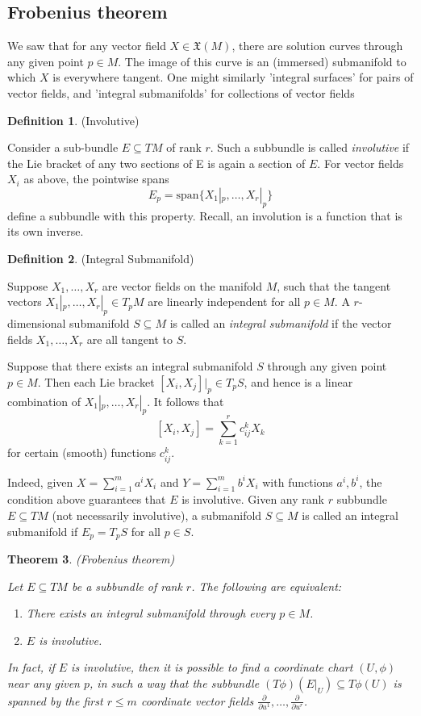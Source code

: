 \documentclass{article}
\newtheorem{theorem}{Theorem}[section]
\theoremstyle{definition}
\newtheorem{defn}[theorem]{Definition}
\newenvironment{definition}
  {\vspace{8pt}\begin{mdframed}[backgroundcolor=blueish]\begin{defn}}
  {\end{defn}\end{mdframed}\vspace{4pt}}
\begin{document}
\subsection{Frobenius theorem}
We saw that for any vector field $X \in \mathfrak X(M)$, there are solution curves through any given point $p \in M$. The image of this curve is an (immersed) submanifold to which $X$ is everywhere tangent. One might similarly 'integral surfaces' for pairs of vector fields, and 'integral submanifolds' for collections of vector fields

\begin{definition} (Involutive)

Consider a sub-bundle $E \subseteq TM$ of rank $r$. Such a subbundle is called \textit{involutive} if the Lie bracket of any two sections of E is again a section of $E$. For vector fields $X_i$ as above, the pointwise spans 
\[
    E_p = \text{span} \{X_1|_p,\dots,X_r |_p\}
\]
define a subbundle with this property. Recall, an involution is a function that is its own inverse.
\end{definition}


\begin{definition} (Integral Submanifold)

Suppose $X_1,\dots,X_r$ are vector fields on the manifold $M$, such that the tangent vectors $X_1|_p,\dots,X_r |_p \in T_pM$ are linearly independent for all $p \in M$. A $r$-dimensional submanifold $S \subseteq M$ is called an \textit{integral submanifold} if the vector fields $X_1,\dots,X_r$ are all tangent to $S$.

Suppose that there exists an integral submanifold $S$ through any given point $p \in M$. Then each Lie bracket $[X_i ,X_j ] |_p \in T_pS$, and hence is a linear combination of $X_1|_p,\dots,X_r |_p.$ It follows that 
\[ 
    [X_i ,X_j ] = \sum_{k=1}^r c^k_{ij}X_k
\]
for certain (smooth) functions $c^k_{i j}$.

Indeed, given $X = \sum_{i=1}^m a^i X_i$ and $Y = \sum^m_{i=1} b^i X_i$ with functions $a^i ,b^i$, the condition above guarantees that $E$ is involutive. Given any rank $r$ subbundle $E \subseteq TM$ (not necessarily involutive), a submanifold $S \subseteq M$ is
called an integral submanifold if $E_p = T_pS$ for all $p \in S$.
\end{definition}


\begin{theorem} (Frobenius theorem)

Let $E \subseteq TM$ be a subbundle of rank $r$. The following are equivalent: 
\begin{enumerate}
    \item There exists an integral submanifold through every $p \in M$.
    \item $E$ is involutive. 
\end{enumerate}

In fact, if $E$ is involutive, then it is possible to find a coordinate chart $(U,\phi)$ near any given $p$, in such a way that the subbundle $(T\phi)(E|_U ) \subseteq T\phi(U)$ is spanned by the first $r \leq m$ coordinate vector fields $\frac{\partial}{\partial u^1},\dots, \frac{\partial}{\partial u^r}$.

\end{theorem}
\end{document}
